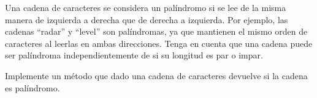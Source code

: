 Una cadena de caracteres se considera un palíndromo si se lee de la misma manera de izquierda a derecha que de derecha a izquierda. Por ejemplo, las cadenas ``radar'' y ``level'' son palíndromas, ya que mantienen el mismo orden de caracteres al leerlas en ambas direcciones. Tenga en cuenta que una cadena puede ser palíndroma independientemente de si su longitud es par o impar.

Implemente un método que dado una cadena de caracteres devuelve si la cadena es palíndromo.
